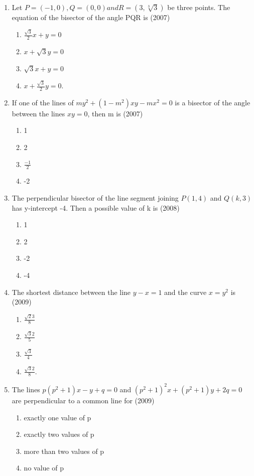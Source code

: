 \documentclass[12pt]{article}
\begin{document}
\begin{enumerate}
\begin{enumerate}
\end{enumerate}
\item Let $P=(-1,0),Q=(0,0) and R=(3,\sqrt[3]{3})$ be three points. The equation of the bisector of the angle PQR is (2007)
\begin{enumerate}
\item $\frac{\sqrt{3}}{2}x+y=0$ 
\item $x+\sqrt{3}y=0$ 
\item $\sqrt{3}x+y=0$ 
\item $x+\frac{\sqrt{3}}{2}y=0$.
\end{enumerate}
\item If one of the lines of $my^2+(1-m^2)xy-mx^2=0$ is a bisector of the angle between the lines $xy=0$, then m is (2007)
\begin{enumerate}
\item 1  
\item 2 
\item $\frac{-1}{2}$ 
\item -2
\end{enumerate}
\item The perpendicular bisector of the line segment joining $P(1,4)$ and $Q(k,3)$ has y-intercept -4. Then a possible value of k is (2008)
\begin{enumerate}
\item  1 
\item  2 
\item -2 
\item -4
\end{enumerate}
\item The shortest distance between the line $y-x=1$ and the curve $x=y^2$ is (2009)
\begin{enumerate}
\item $\frac{\sqrt{2}{3}}{8}$ 
\item $\frac{\sqrt{3}{2}}{5}$ 
\item $\frac{\sqrt{3}}{4}$ 
\item $\frac{\sqrt{3}{2}}{8}$.
\end{enumerate}
\item The lines $p(p^2+1)x-y+q=0$ and $(p^2+1)^2x+(p^2+1)y+2q=0$ are perpendicular to a common line for (2009)
\begin{enumerate}
\item exactly one value of p
\item exactly two values of p
\item more than two values of p
\item no value of p
\end{enumerate}

\end{enumerate}
\end{document}
